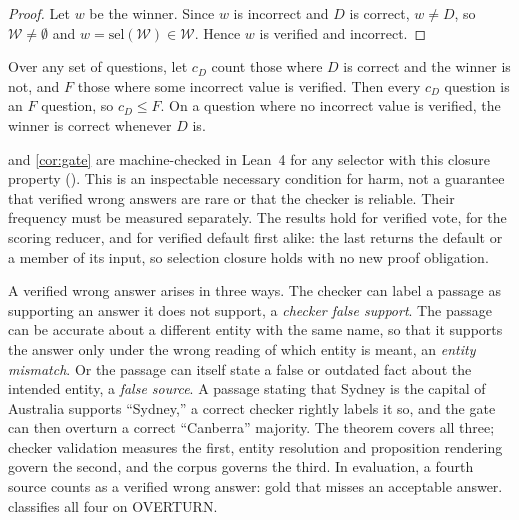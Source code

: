 \begin{proof}
Let $w$ be the winner. Since $w$ is incorrect and $D$ is correct, $w \neq D$, so $\mathcal{W} \neq \emptyset$ and $w = \mathrm{sel}(\mathcal{W}) \in \mathcal{W}$. Hence $w$ is verified and incorrect.
\end{proof}

\begin{corollary}
\label{cor:gate}
Over any set of questions, let $c_D$ count those where $D$ is correct and the winner is not, and $F$ those where some incorrect value is verified. Then every $c_D$ question is an $F$ question, so $c_D \leq F$. On a question where no incorrect value is verified, the winner is correct whenever $D$ is.
\end{corollary}

 and \cref{cor:gate} are machine-checked in Lean~4 for any selector with this closure property (). This is an inspectable necessary condition for harm, not a guarantee that verified wrong answers are rare or that the checker is reliable. Their frequency must be measured separately. The results hold for verified vote, for the scoring reducer, and for verified default first alike: the last returns the default or a member of its input, so selection closure holds with no new proof obligation.

A verified wrong answer arises in three ways. The checker can label a passage as supporting an answer it does not support, a \emph{checker false support}. The passage can be accurate about a different entity with the same name, so that it supports the answer only under the wrong reading of which entity is meant, an \emph{entity mismatch}. Or the passage can itself state a false or outdated fact about the intended entity, a \emph{false source}. A passage stating that Sydney is the capital of Australia supports ``Sydney,'' a correct checker rightly labels it so, and the gate can then overturn a correct ``Canberra'' majority. The theorem covers all three; checker validation measures the first, entity resolution and proposition rendering govern the second, and the corpus governs the third. In evaluation, a fourth source counts as a verified wrong answer: gold that misses an acceptable answer.  classifies all four on OVERTURN.

